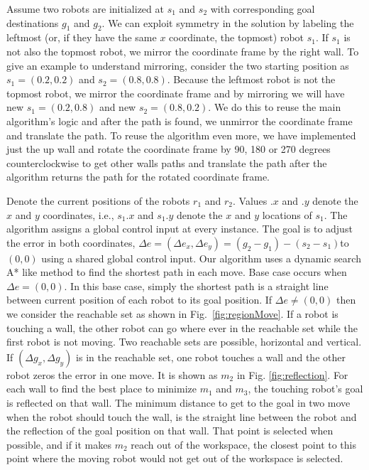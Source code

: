 Assume two robots are initialized at $s_1$ and $s_2$ with corresponding goal destinations $g_1$ and $g_2$. 
We can exploit symmetry in the solution by labeling the leftmost  (or, if they have the same $x$ coordinate, the topmost) robot $s_1$.  If $s_1$ is not also the topmost robot, we mirror the coordinate frame by the right wall. To give an example to understand mirroring, consider the two starting position as $s_1 =  (0.2, 0.2) $ and $s_2 = (0.8, 0.8)$. Because the leftmost robot is not the topmost robot, we mirror the coordinate frame and by mirroring we will have new $s_1 = (0.2, 0.8)$ and new $s_2 = (0.8,0.2)$. We do this to reuse the main algorithm's logic and after the path is found, we unmirror the coordinate frame and translate the path. To reuse the algorithm even more, we have implemented just the up wall and rotate the coordinate frame by 90, 180 or 270 degrees counterclockwise to get other walls paths and translate the path after the algorithm returns the path for the rotated coordinate frame.

Denote the current positions of the robots  $r_1$ and $r_2$. 
Values $.x$ and $.y$ denote the $x$ and $y$ coordinates, i.e., $s_1.x$ and $s_1.y$ denote the $x$ and $y$ locations of $s_1$. 
The algorithm assigns a global control input at every instance.
The goal is to adjust the error in both coordinates,
 $\Delta e =(\Delta e_x, \Delta e_y) =(g_2-g_1)- (s_2-s_1)$to $(0,0)$ using a shared global control input. 
Our algorithm uses a dynamic search A* like method to find the shortest path in each move. Base case occurs when $\Delta e= (0,0)$. In this base case, simply the shortest path is a straight line between current position of each robot to its goal position. 
If  $\Delta e\neq (0,0)$ then we consider the reachable set as shown in Fig.~\ref{fig:regionMove}. If a robot is touching a wall, the other robot can go where ever in the reachable set while the first robot is not moving. 
Two reachable sets are possible, horizontal and vertical. 
If $(\Delta g_x, \Delta g_y)$ is in the reachable set, one robot touches a wall and the other robot zeros the error in one move. It is shown as $m_2$ in Fig. \ref{fig:reflection}. For each wall to find the best place to minimize $m_1$ and $m_3$, the touching robot's goal is reflected on that wall. The minimum distance to get to the goal in two move when the robot should touch the wall, is the straight line between the robot and the reflection of the goal position on that wall. That point is selected when possible, and if it makes $m_2$ reach out of the workspace, the closest point to this point where the moving robot would not get out of the workspace is selected.

